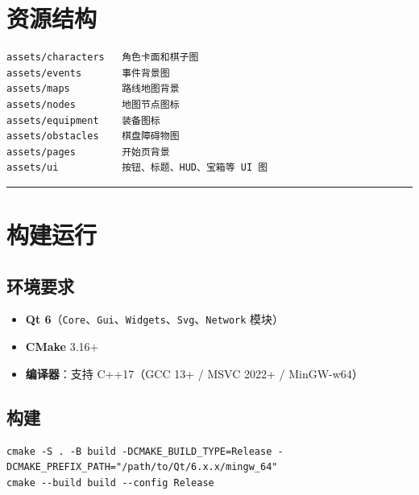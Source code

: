 \documentclass[UTF8,10pt]{ctexart}
\begin{document}
\section*{资源结构}

\begin{lstlisting}
assets/characters   角色卡面和棋子图
assets/events       事件背景图
assets/maps         路线地图背景
assets/nodes        地图节点图标
assets/equipment    装备图标
assets/obstacles    棋盘障碍物图
assets/pages        开始页背景
assets/ui           按钮、标题、HUD、宝箱等 UI 图
\end{lstlisting}

\par\medskip\hrule\medskip

\section*{构建运行}

\subsection*{环境要求}

\begin{itemize}
\item \textbf{Qt 6}（\texttt{Core}、\texttt{Gui}、\texttt{Widgets}、\texttt{Svg}、\texttt{Network} 模块）
\item \textbf{CMake} 3.16+
\item \textbf{编译器}：支持 C++17（GCC 13+ / MSVC 2022+ / MinGW-w64）
\end{itemize}

\subsection*{构建}

\begin{lstlisting}
cmake -S . -B build -DCMAKE_BUILD_TYPE=Release -DCMAKE_PREFIX_PATH="/path/to/Qt/6.x.x/mingw_64"
cmake --build build --config Release
\end{lstlisting}
\end{document}
